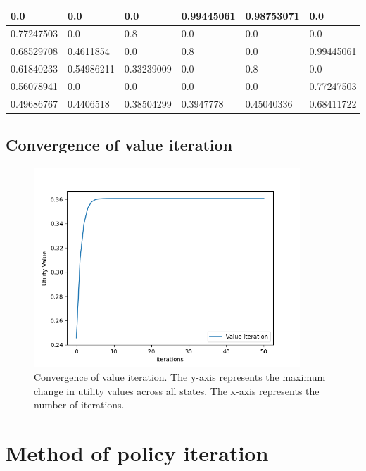 \documentclass{article}
\begin{document}
\begin{table}[H]
    \begin{tabular}{|l|l|l|l|l|l|}
        \hline
        0.0        & 0.0        & 0.0        & 0.99445061 & 0.98753071 & 0.0        \\\hline
        0.77247503 & 0.0        & 0.8        & 0.0        & 0.0        & 0.0        \\\hline
        0.68529708 & 0.4611854  & 0.0        & 0.8        & 0.0        & 0.99445061 \\\hline
        0.61840233 & 0.54986211 & 0.33239009 & 0.0        & 0.8        & 0.0        \\\hline
        0.56078941 & 0.0        & 0.0        & 0.0        & 0.0        & 0.77247503 \\\hline
        0.49686767 & 0.4406518  & 0.38504299 & 0.3947778  & 0.45040336 & 0.68411722 \\\hline
    \end{tabular}
\end{table}

\subsection{Convergence of value iteration}

\begin{figure}[H]
    \includegraphics[width=100mm]{../asset/value_iteration_curve.png}
    \caption{Convergence of value iteration. The y-axis represents the maximum change in utility values across all states. The x-axis represents the number of iterations.}
    \label{fig:value_iteration_convergence}
\end{figure}

\section{Method of policy iteration}
\end{document}
